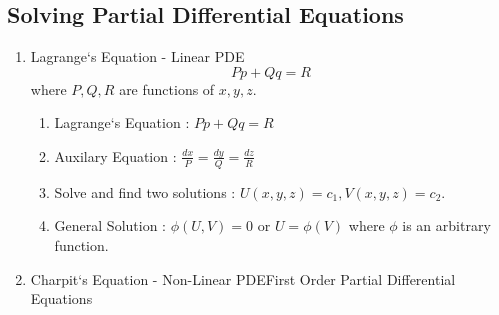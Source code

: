 \subsection{Solving Partial Differential Equations}
\begin{enumerate}
	\item Lagrange`s Equation - Linear PDE
	\begin{equation}
		Pp + Qq = R
	\end{equation}
		where $P,Q,R$ are functions of $x,y,z$.
	\begin{enumerate}
		\item Lagrange`s Equation : $Pp + Qq = R$
		\item Auxilary Equation : $\frac{dx}{P} = \frac{dy}{Q} = \frac{dz}{R}$
		\item Solve and find two solutions : $U(x,y,z) = c_1, V(x,y,z) = c_2$.
		\item General Solution : $\phi(U,V) = 0$ or $U = \phi(V)$ where $\phi$ is an arbitrary function.
	\end{enumerate}

	\item Charpit`s Equation - Non-Linear PDEFirst Order Partial Differential Equations\\
\end{enumerate}

